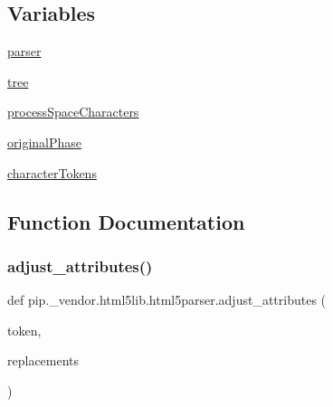 \subsection*{Variables}
\begin{DoxyCompactItemize}
\item 
\hyperlink{namespacepip_1_1__vendor_1_1html5lib_1_1html5parser_a7eee36a5229527cdcf80d00006d24fb1}{parser}
\item 
\hyperlink{namespacepip_1_1__vendor_1_1html5lib_1_1html5parser_adc619b05e0c27fef24254640b81ab765}{tree}
\item 
\hyperlink{namespacepip_1_1__vendor_1_1html5lib_1_1html5parser_a97a21b1156a796b014633c6cc39772c7}{process\+Space\+Characters}
\item 
\hyperlink{namespacepip_1_1__vendor_1_1html5lib_1_1html5parser_ab01c219b453aed4db3bc9fca1d7df59c}{original\+Phase}
\item 
\hyperlink{namespacepip_1_1__vendor_1_1html5lib_1_1html5parser_aa04126a7b723997216e34603814f185b}{character\+Tokens}
\end{DoxyCompactItemize}


\subsection{Function Documentation}
\mbox{\label{namespacepip_1_1__vendor_1_1html5lib_1_1html5parser_a3e86a41447e2a8e818ccbb654bec63fc}} 
\subsubsection{\texorpdfstring{adjust\+\_\+attributes()}{adjust\_attributes()}}
{\footnotesize\ttfamily def pip.\+\_\+vendor.\+html5lib.\+html5parser.\+adjust\+\_\+attributes (\begin{DoxyParamCaption}\item[{}]{token,  }\item[{}]{replacements }\end{DoxyParamCaption})}

\mbox{\label{namespacepip_1_1__vendor_1_1html5lib_1_1html5parser_a5ee39623fbd3cfa851e37def46a978d4}} 
